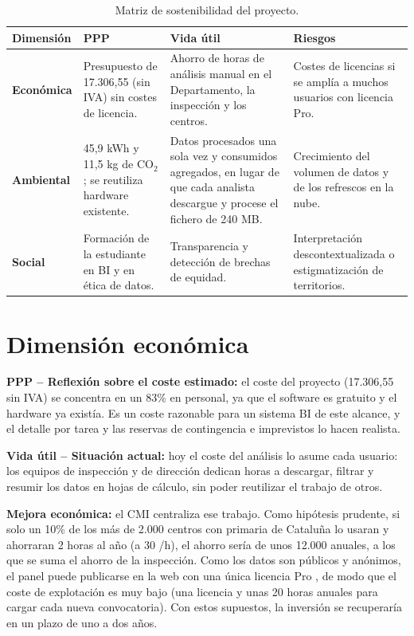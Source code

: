 \documentclass[12pt, a4paper, oneside]{report}
\begin{document}
\begin{table}[H]
\centering
\small
\renewcommand{\arraystretch}{1.1}
\setlength{\tabcolsep}{3pt}
\begin{tabularx}{\textwidth}{@{} p{2.0cm} X X X @{}}
\toprule
\textbf{Dimensión} & \textbf{PPP} & \textbf{Vida útil} & \textbf{Riesgos} \\ \midrule
\textbf{Económica} & Presupuesto de 17.306,55 \texteuro{} (sin IVA) sin costes de licencia. & Ahorro de horas de análisis manual en el Departamento, la inspección y los centros. & Costes de licencias si se amplía a muchos usuarios con licencia Pro. \\ \addlinespace
\textbf{Ambiental} & 45,9 kWh y 11,5 kg de CO$_2$; se reutiliza hardware existente. & Datos procesados una sola vez y consumidos agregados, en lugar de que cada analista descargue y procese el fichero de 240 MB. & Crecimiento del volumen de datos y de los refrescos en la nube. \\ \addlinespace
\textbf{Social} & Formación de la estudiante en BI y en ética de datos. & Transparencia y detección de brechas de equidad. & Interpretación descontextualizada o estigmatización de territorios. \\ \bottomrule
\end{tabularx}
\caption{Matriz de sostenibilidad del proyecto.}
\label{tab:matriz_sost}
\end{table}

\section{Dimensión económica}
\textbf{PPP -- Reflexión sobre el coste estimado:} el coste del proyecto (17.306,55 \texteuro{} sin IVA) se concentra en un 83\% en personal, ya que el software es gratuito y el hardware ya existía. Es un coste razonable para un sistema BI de este alcance, y el detalle por tarea y las reservas de contingencia e imprevistos lo hacen realista.

\textbf{Vida útil -- Situación actual:} hoy el coste del análisis lo asume cada usuario: los equipos de inspección y de dirección dedican horas a descargar, filtrar y resumir los datos en hojas de cálculo, sin poder reutilizar el trabajo de otros.

\textbf{Mejora económica:} el CMI centraliza ese trabajo. Como hipótesis prudente, si solo un 10\% de los más de 2.000 centros con primaria de Cataluña lo usaran y ahorraran 2 horas al año (a 30 \texteuro{}/h), el ahorro sería de unos 12.000 \texteuro{} anuales, a los que se suma el ahorro de la inspección. Como los datos son públicos y anónimos, el panel puede publicarse en la web con una única licencia Pro \cite{ms_powerbi_pricing}, de modo que el coste de explotación es muy bajo (una licencia y unas 20 horas anuales para cargar cada nueva convocatoria). Con estos supuestos, la inversión se recuperaría en un plazo de uno a dos años.
\end{document}

